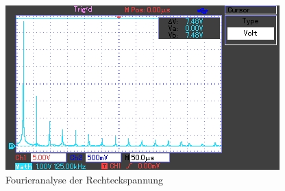 	\begin{figure}[h]
		\begin{center}
		\includegraphics[scale=1.0]{picfar.jpg}
		\caption{Fourieranalyse der Rechteckspannung}
		\label{picfar}
		\end{center}	
	\end{figure}